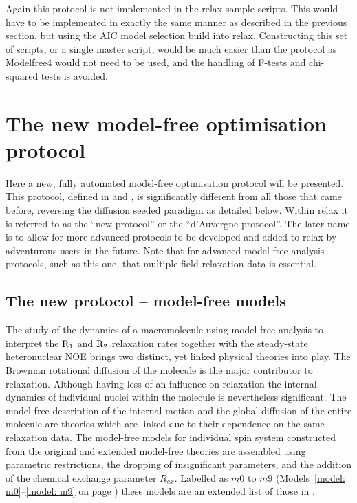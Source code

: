 Again this protocol is not implemented in the relax sample scripts.
This would have to be implemented in exactly the same manner as described in the previous section, but using the AIC model selection build into relax.
Constructing this set of scripts, or a single master script, would be much easier than the \citet{Mandel95} protocol as Modelfree4 would not need to be used, and the handling of F-tests and chi-squared tests is avoided.




\section{The new model-free optimisation protocol}
\label{sect: new model-free protocol}

Here a new, fully automated model-free optimisation protocol will be presented.
This protocol, defined in \citet{dAuvergneGooley07} and \citet{dAuvergneGooley08b}, is significantly different from all those that came before, reversing the diffusion seeded paradigm as detailed below.
Within relax it is referred to as the ``new protocol'' or the ``d'Auvergne protocol''.
The later name is to allow for more advanced protocols to be developed and added to relax by adventurous users in the future.
Note that for advanced model-free analysis protocols, such as this one, that multiple field relaxation data is essential.



\subsection{The new protocol -- model-free models}

The study of the dynamics of a macromolecule using model-free analysis to interpret the $\mathrm{R}_1$ and $\mathrm{R}_2$ relaxation rates together with the steady-state heteronuclear NOE brings two distinct, yet linked physical theories into play.
The Brownian rotational diffusion of the molecule is the major contributor to relaxation.
Although having less of an influence on relaxation the internal dynamics of individual nuclei within the molecule is nevertheless significant.
The model-free description of the internal motion and the global diffusion of the entire molecule are theories which are linked due to their dependence on the same relaxation data.
The model-free models for individual spin system constructed from the original and extended model-free theories \citep{LipariSzabo82a, LipariSzabo82b, Clore90a} are assembled using parametric restrictions, the dropping of insignificant parameters, and the addition of the chemical exchange parameter $R_{ex}$.
Labelled as $m0$ to $m9$ (Models~\ref{model: m0}--\ref{model: m9} on page \pageref{model: m9}) these models are an extended list of those in \citep{Fushman97, Orekhov99b, Korzhnev01, Zhuravleva04}.



